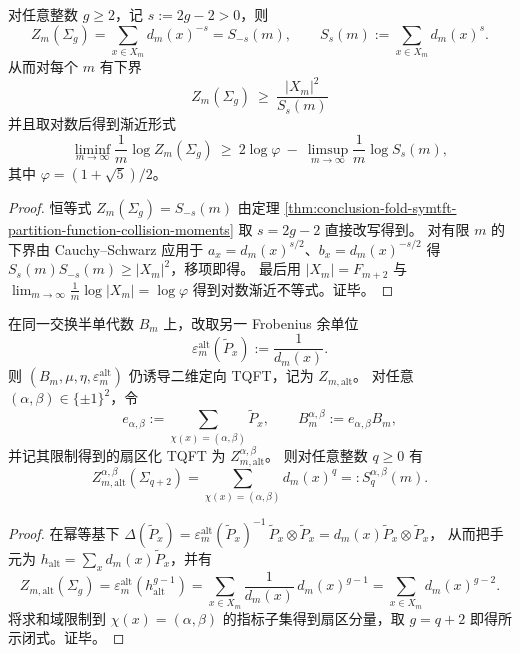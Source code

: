\begin{corollary}\label{cor:conclusion-tqft-genus-bound-by-positive-pressure}
对任意整数 \(g\ge 2\)，记 \(s:=2g-2>0\)，则
\[
Z_m(\Sigma_g)=\sum_{x\in X_m}d_m(x)^{-s}=S_{-s}(m),
\qquad
S_s(m):=\sum_{x\in X_m}d_m(x)^{s}.
\]
从而对每个 \(m\) 有下界
\[
\boxed{\;
Z_m(\Sigma_g)\ \ge\ \frac{|X_m|^2}{S_s(m)}\;}
\]
并且取对数后得到渐近形式
\[
\liminf_{m\to\infty}\frac{1}{m}\log Z_m(\Sigma_g)\ \ge\ 2\log\varphi\ -\ \limsup_{m\to\infty}\frac{1}{m}\log S_s(m),
\]
其中 \(\varphi=(1+\sqrt5)/2\)。
\end{corollary}
\begin{proof}
恒等式 \(Z_m(\Sigma_g)=S_{-s}(m)\) 由定理 \ref{thm:conclusion-fold-symtft-partition-function-collision-moments} 取 \(s=2g-2\) 直接改写得到。
对有限 \(m\) 的下界由 Cauchy--Schwarz 应用于 \(a_x=d_m(x)^{s/2}\)、\(b_x=d_m(x)^{-s/2}\) 得
\(
S_s(m)S_{-s}(m)\ge |X_m|^2
\)，移项即得。
最后用 \(|X_m|=F_{m+2}\) 与 \(\lim_{m\to\infty}\frac{1}{m}\log|X_m|=\log\varphi\) 得到对数渐近不等式。证毕。
\end{proof}

\begin{corollary}\label{cor:conclusion-sector-resolved-collision-moments-by-genus}
在同一交换半单代数 \(B_m\) 上，改取另一 Frobenius 余单位
\[
\varepsilon_m^{\mathrm{alt}}(\widetilde P_x):=\frac{1}{d_m(x)}.
\]
则 \((B_m,\mu,\eta,\varepsilon_m^{\mathrm{alt}})\) 仍诱导二维定向 TQFT，记为 \(Z_{m,\mathrm{alt}}\)。
对任意 \((\alpha,\beta)\in\{\pm 1\}^2\)，令
\[
e_{\alpha,\beta}:=\sum_{\chi(x)=(\alpha,\beta)}\widetilde P_x,
\qquad
B_m^{\alpha,\beta}:=e_{\alpha,\beta}B_m,
\]
并记其限制得到的扇区化 TQFT 为 \(Z_{m,\mathrm{alt}}^{\alpha,\beta}\)。
则对任意整数 \(q\ge 0\) 有
\[
Z_{m,\mathrm{alt}}^{\alpha,\beta}(\Sigma_{q+2})
=
\sum_{\chi(x)=(\alpha,\beta)} d_m(x)^q
=:S_q^{\alpha,\beta}(m).
\]
\end{corollary}
\begin{proof}
在幂等基下
\(
\Delta(\widetilde P_x)=\varepsilon_m^{\mathrm{alt}}(\widetilde P_x)^{-1}\,\widetilde P_x\otimes \widetilde P_x
=d_m(x)\widetilde P_x\otimes \widetilde P_x
\)，
从而把手元为 \(h_{\mathrm{alt}}=\sum_x d_m(x)\widetilde P_x\)，并有
\[
Z_{m,\mathrm{alt}}(\Sigma_g)=\varepsilon_m^{\mathrm{alt}}(h_{\mathrm{alt}}^{g-1})
=\sum_{x\in X_m}\frac{1}{d_m(x)}\,d_m(x)^{g-1}
=\sum_{x\in X_m}d_m(x)^{g-2}.
\]
将求和域限制到 \(\chi(x)=(\alpha,\beta)\) 的指标子集得到扇区分量，取 \(g=q+2\) 即得所示闭式。证毕。
\end{proof}


